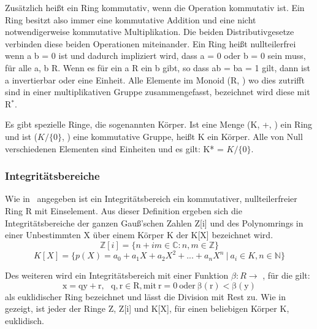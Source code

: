 			Zusätzlich heißt ein Ring kommutativ, wenn die Operation \mycdot kommutativ ist. Ein Ring besitzt also immer eine kommutative Addition und eine nicht notwendigerweise kommutative Multiplikation. Die beiden Distributivgesetze verbinden diese beiden Operationen miteinander. Ein Ring heißt nullteilerfrei wenn a \mycdot b = 0 ist und dadurch impliziert wird, dass a = 0 oder b = 0 sein muss, für alle a, b \myin R. Wenn es für ein a \myin R ein b gibt, so dass ab = ba = 1 gilt, dann ist a invertierbar oder eine Einheit. Alle Elemente im Monoid (R, \mycdotOhne) wo dies zutrifft sind in einer multiplikativen Gruppe zusammengefasst, bezeichnet wird diese mit R$^*$.~\cite{Erste:Hilfe:in:Linearer:Algebra}
			
			Es gibt spezielle Ringe, die sogenannten Körper. Ist eine Menge (K, +, \mycdotOhne) ein Ring und ist ($K / \{0\}$, \mycdotOhne) eine kommutative Gruppe, heißt K ein Körper. Alle von Null verschiedenen Elementen sind Einheiten und es gilt: K* = $K / \{0\}$.~\cite{Erste:Hilfe:in:Linearer:Algebra}
			
		\subsubsection{Integritätsbereiche}
			Wie in~\cite{Algorithmische:Zahlentheorie} angegeben ist ein Integritätsbereich ein kommutativer, nullteilerfreier Ring R mit Einselement. Aus dieser Definition ergeben sich die Integritätsbereiche der ganzen Gauß’schen Zahlen Z[i] und des Polynomrings in einer Unbestimmten X über einem Körper K der K[X] bezeichnet wird. 
			\begin{displaymath}
				\mathbb{Z}[i] = \{n + im  \in \mathbb{C} : n,m \in \mathbb{Z}\}
			\end{displaymath}
			\begin{displaymath}	
				K[X] = \{p(X)= a_0 + a_1X + a_2X^2 + . . . + a_nX^n~|~a_i \in K, n \in \mathbb{N}\}					
			\end{displaymath}

			Des weiteren wird ein Integritätsbereich mit einer Funktion  $\beta : R \longrightarrow$ , für die gilt: 
			\begin{displaymath}
				\mathrm{x = qy + r,~~~q, r \in R,	mit~r=0~oder~\beta(r) < \beta(y)}
			\end{displaymath}
			als euklidischer Ring bezeichnet und lässt die Division mit Rest zu. Wie in \cite{Algorithmische:Zahlentheorie} gezeigt, ist jeder der Ringe Z, Z[i] und K[X], für einen beliebigen Körper K, euklidisch.
			
